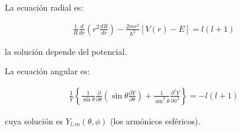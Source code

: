 \begin{frame}{}

    \begin{tcolorbox}[colback=blue!5!white, colframe =blue!75!black, title= Ecuaciones separadas \cite{griffiths2018introduction}]
    
        La ecuación radial es:
        
        \begin{align*}
            \frac{1}{R} \frac{d}{dr} \left( r^2 \frac{dR}{dr} \right) - \frac{2mr^2}{\hbar^2} \left[ V(r) - E \right] = l(l+1)
        \end{align*}
        
        la solución depende del potencial.
        
        La ecuación angular es:
        
        \begin{align*}
            \frac{1}{Y} \left\{ \frac{1}{\sin{\theta}} \frac{\partial}{\partial \theta} \left(  \sin{\theta} \frac{ \partial Y}{\partial \theta} \right) + \frac{1}{\sin^2{\theta}} \frac{\partial^2 Y }{ \partial \phi^2 } \right\} = -l(l+1)
        \end{align*}
        
        cuya solución es $Y_{l,m} ( \theta, \phi ) $ (los armónicos esféricos).
        
    \end{tcolorbox}
    
\end{frame}






